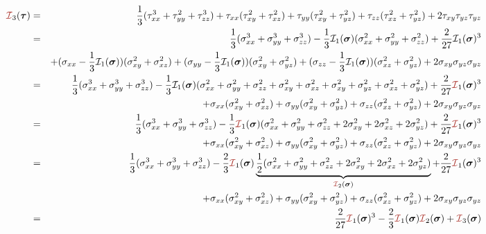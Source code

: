 \begin{eqnarray}
{\III}_3(\bm\tau) 
&=& 
\frac{1}{3}(\tau_{xx}^3 + \tau_{yy}^2 + \tau_{zz}^3) 
+\tau_{xx}(\tau_{xy}^2 + \tau_{xz}^2 ) 
+\tau_{yy}(\tau_{xy}^2 + \tau_{yz}^2 ) 
+\tau_{zz}(\tau_{xz}^2 + \tau_{yz}^2 ) 
+2\tau_{xy}\tau_{yz}\tau_{yz} \nn\\
&=& 
\frac{1}{3}(\sigma_{xx}^3 + \sigma_{yy}^3 + \sigma_{zz}^3)
-\frac13{\cal I}_1(\bm\sigma) (\sigma_{xx}^2+\sigma_{yy}^2+\sigma_{zz}^2)
+\frac{2}{27} {\cal I}_1(\bm\sigma)^3 \nn\\
&& 
+(\sigma_{xx}-\frac13 {\cal I}_1(\bm\sigma))(\sigma_{xy}^2 + \sigma_{xz}^2 ) 
+(\sigma_{yy}-\frac13 {\cal I}_1(\bm\sigma))(\sigma_{xy}^2 + \sigma_{yz}^2 ) 
+(\sigma_{zz}-\frac13 {\cal I}_1(\bm\sigma))(\sigma_{xz}^2 + \sigma_{yz}^2 ) 
+2\sigma_{xy}\sigma_{yz}\sigma_{yz} \nn\\
&=& 
\frac{1}{3}(\sigma_{xx}^3 + \sigma_{yy}^3 + \sigma_{zz}^3)
-\frac13{\cal I}_1(\bm\sigma) (\sigma_{xx}^2+\sigma_{yy}^2+\sigma_{zz}^2
+ \sigma_{xy}^2 + \sigma_{xz}^2
+\sigma_{xy}^2 + \sigma_{yz}^2
+\sigma_{xz}^2 + \sigma_{yz}^2 
)
+\frac{2}{27} {\III}_1(\bm\sigma)^3 \nn\\
&& 
+\sigma_{xx}(\sigma_{xy}^2 + \sigma_{xz}^2 ) 
+\sigma_{yy}(\sigma_{xy}^2 + \sigma_{yz}^2 ) 
+\sigma_{zz}(\sigma_{xz}^2 + \sigma_{yz}^2 ) 
+2\sigma_{xy}\sigma_{yz}\sigma_{yz} \nn\\
&=& 
\frac{1}{3}(\sigma_{xx}^3 + \sigma_{yy}^3 + \sigma_{zz}^3)
-\frac13{\III}_1(\bm\sigma) (\sigma_{xx}^2+\sigma_{yy}^2+\sigma_{zz}^2
+ 2\sigma_{xy}^2 + 2\sigma_{xz}^2 + 2\sigma_{yz}^2  )
+\frac{2}{27} {\III}_1(\bm\sigma)^3 \nn\\
&& 
+\sigma_{xx}(\sigma_{xy}^2 + \sigma_{xz}^2 ) 
+\sigma_{yy}(\sigma_{xy}^2 + \sigma_{yz}^2 ) 
+\sigma_{zz}(\sigma_{xz}^2 + \sigma_{yz}^2 ) 
+2\sigma_{xy}\sigma_{yz}\sigma_{yz} \nn\\
&=& 
\frac{1}{3}(\sigma_{xx}^3 + \sigma_{yy}^3 + \sigma_{zz}^3)
-\frac23{\III}_1(\bm\sigma)
\underbrace{\frac12  (\sigma_{xx}^2+\sigma_{yy}^2+\sigma_{zz}^2
+ 2\sigma_{xy}^2 + 2\sigma_{xz}^2 + 2\sigma_{yz}^2  )}_{{\III}_2(\bm\sigma)}
+\frac{2}{27} {\III}_1(\bm\sigma)^3 \nn\\
&& 
+\sigma_{xx}(\sigma_{xy}^2 + \sigma_{xz}^2 ) 
+\sigma_{yy}(\sigma_{xy}^2 + \sigma_{yz}^2 ) 
+\sigma_{zz}(\sigma_{xz}^2 + \sigma_{yz}^2 ) 
+2\sigma_{xy}\sigma_{yz}\sigma_{yz} \nn\\
&=& \frac{2}{27}  {\III}_1(\bm\sigma)^3 - \frac23{\III}_1(\bm\sigma) {\III}_2(\bm\sigma)
+{\III}_3(\bm\sigma) \nn
\end{eqnarray}

